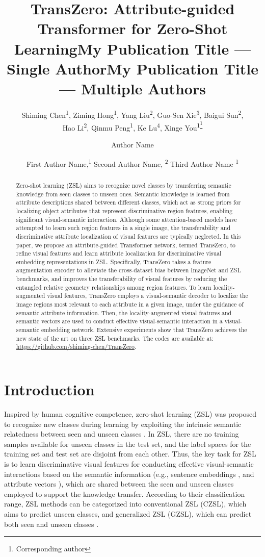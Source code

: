 \documentclass[letterpaper]{article} %
\title{TransZero: Attribute-guided Transformer for Zero-Shot Learning}
\author{
	    Shiming Chen\textsuperscript{\rm 1}\equalcontrib,
	    Ziming Hong\textsuperscript{\rm 1}\equalcontrib,
	    Yang Liu\textsuperscript{\rm 2},
	    Guo-Sen Xie\textsuperscript{\rm 3},
	    Baigui Sun\textsuperscript{\rm 2},\\
	    Hao Li\textsuperscript{\rm 2},
	    Qinmu Peng\textsuperscript{\rm 1},
	    Ke Lu\textsuperscript{\rm 4},
	    Xinge You\textsuperscript{\rm 1\thanks{Corresponding author}}
}
\title{My Publication Title --- Single Author}
\author {
	Author Name
}
\title{My Publication Title --- Multiple Authors}
\author {
	First Author Name,\textsuperscript{\rm 1}
	Second Author Name, \textsuperscript{\rm 2}
	Third Author Name \textsuperscript{\rm 1}
}
\begin{document}
	\maketitle
	
	\begin{abstract}
		Zero-shot learning (ZSL) aims to recognize novel classes by transferring semantic knowledge from seen classes to unseen ones. Semantic knowledge is learned from attribute descriptions shared between different classes, which act as strong priors for localizing object attributes that represent discriminative region features, enabling significant visual-semantic interaction. Although some attention-based models have attempted to learn such region features in a single image, the transferability and discriminative attribute localization of visual features are typically neglected. In this paper, we propose an attribute-guided Transformer network, termed TransZero, to refine visual features and learn attribute localization for discriminative visual embedding representations in ZSL. Specifically, TransZero takes a feature augmentation encoder to alleviate the cross-dataset bias between ImageNet and ZSL benchmarks, and improves the transferability of visual features by reducing the entangled relative geometry relationships among region features. To learn locality-augmented visual features, TransZero employs a visual-semantic decoder to localize the image regions most relevant to each attribute in a given image, under the guidance of semantic attribute information. Then, the locality-augmented visual features and semantic vectors are used to conduct effective visual-semantic interaction in a visual-semantic embedding network. Extensive experiments show that TransZero achieves the new state of the art on three ZSL benchmarks. The codes are available at: \url{https://github.com/shiming-chen/TransZero}.
	\end{abstract}
	
	
	\section{Introduction}\label{sec1}
	\noindent Inspired by human cognitive competence, zero-shot learning (ZSL) was proposed to recognize new classes during learning by exploiting the intrinsic semantic relatedness between seen and unseen classes \cite{Larochelle2008ZerodataLO,Palatucci2009ZeroshotLW,Lampert2009LearningTD}. In ZSL, there are no training samples available for unseen classes in the test set, and the label spaces for the training set and test set are disjoint from each other. Thus, the key task for ZSL is to learn discriminative visual features for conducting effective visual-semantic interactions based on the semantic information (e.g., sentence embeddings \cite{Reed2016LearningDR}, and attribute vectors \cite{Lampert2014AttributeBasedCF}), which are shared between the seen and unseen classes employed to support the knowledge transfer. According to their classification range, ZSL methods can be categorized into conventional ZSL (CZSL), which aims to predict unseen classes, and generalized ZSL (GZSL), which can predict both seen and unseen classes \cite{Xian2017ZeroShotLC}.
	
\end{document}
